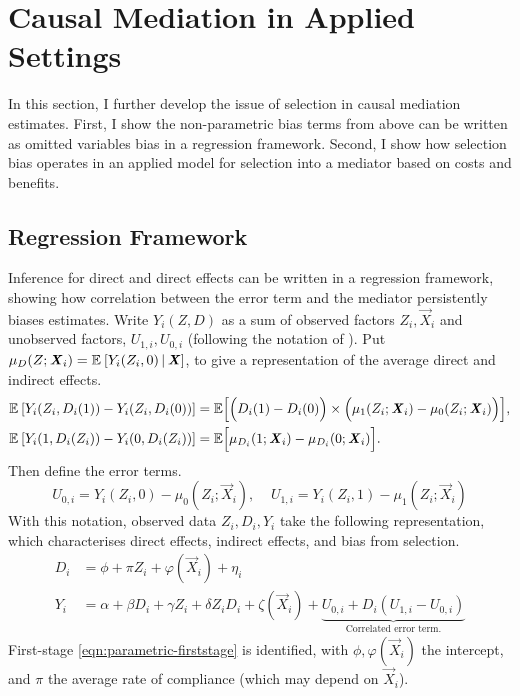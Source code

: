 \section{Causal Mediation in Applied Settings}
\label{sec:selection}
In this section, I further develop the issue of selection in causal mediation estimates. First, I show the non-parametric bias terms from above can be written as omitted variables bias in a regression framework.
Second, I show how selection bias operates in an applied model for selection into a mediator based on costs and benefits.

\subsection{Regression Framework}
\label{sec:regression}
Inference for direct and direct effects can be written in a regression framework, showing how correlation between the error term and the mediator persistently biases estimates.
Write $Y_i(Z, D)$ as a sum of observed factors $Z_i, \vec X_i$ and unobserved factors, $U_{1,i}, U_{0,i}$ (following the notation of \citealt{heckman2005structural}).
Put $\mu_D(Z; \boldsymbol{\mathit{X}}_i) = \mathbb{E}_{} \left[ Y_i(Z_i, 0) \, \middle\vert \, \boldsymbol{\mathit{X}} \right]$, to give a representation of the average direct and indirect effects.
\begin{align*}
    \mathbb{E}_{} \left[ Y_i(Z_i, D_i(1)) - Y_i(Z_i, D_i(0)) \right]
    &= \mathbb{E} \Big[ \Big( D_i(1) - D_i(0) \Big)
        \times \Big( \mu_1(Z_i; \boldsymbol{\mathit{X}}_i) - \mu_0(Z_i; \boldsymbol{\mathit{X}}_i) \Big) \Big], \\
    \mathbb{E}_{} \left[ Y_i(1, D_i(Z_i)) - Y_i(0, D_i(Z_i)) \right]
        &= \mathbb{E} \Big[ \mu_{D_i}(1; \boldsymbol{\mathit{X}}_i) - \mu_{D_i}(0; \boldsymbol{\mathit{X}}_i) \Big].
\end{align*}
Then define the error terms.
\[ U_{0,i} = Y_i(Z_i, 0) - \mu_0(Z_i; \vec X_i),\;\;\;\;
U_{1,i} = Y_i(Z_i, 1) - \mu_1(Z_i; \vec X_i) \]
With this notation, observed data $Z_i, D_i, Y_i$ take the following representation, which characterises direct effects, indirect effects, and bias from selection.
\begin{align}
    \label{eqn:parametric-firststage}
    D_i &= \phi + \pi Z_i + \varphi(\vec X_i) + \eta_i  \\
    \label{eqn:parametric-secondstage}
    Y_i &= \alpha + \beta D_i + \gamma Z_i + \delta Z_i D_i
    + \zeta(\vec X_i)
    + \underbrace{U_{0,i} + D_i \left( U_{1,i} - U_{0,i} \right)}_{
        \text{Correlated error term.}}
\end{align}
First-stage \eqref{eqn:parametric-firststage} is identified, with $\phi, \varphi(\vec X_i)$ the intercept, and $\pi$ the average rate of compliance (which may depend on $\vec X_i$).

